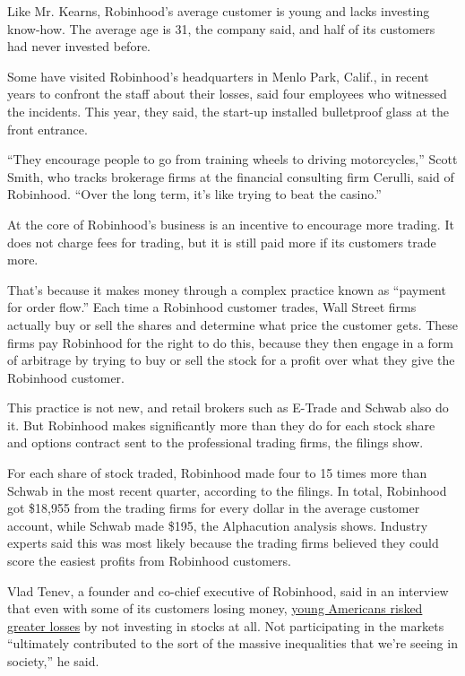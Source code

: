 Like Mr. Kearns, Robinhood's average customer is young and lacks
investing know-how. The average age is 31, the company said, and half of
its customers had never invested before.

Some have visited Robinhood's headquarters in Menlo Park, Calif., in
recent years to confront the staff about their losses, said four
employees who witnessed the incidents. This year, they said, the
start-up installed bulletproof glass at the front entrance.

``They encourage people to go from training wheels to driving
motorcycles,'' Scott Smith, who tracks brokerage firms at the financial
consulting firm Cerulli, said of Robinhood. ``Over the long term, it's
like trying to beat the casino.''

At the core of Robinhood's business is an incentive to encourage more
trading. It does not charge fees for trading, but it is still paid more
if its customers trade more.

That's because it makes money through a complex practice known as
``payment for order flow.'' Each time a Robinhood customer trades, Wall
Street firms actually buy or sell the shares and determine what price
the customer gets. These firms pay Robinhood for the right to do this,
because they then engage in a form of arbitrage by trying to buy or sell
the stock for a profit over what they give the Robinhood customer.

This practice is not new, and retail brokers such as E-Trade and Schwab
also do it. But Robinhood makes significantly more than they do for each
stock share and options contract sent to the professional trading firms,
the filings show.

For each share of stock traded, Robinhood made four to 15 times more
than Schwab in the most recent quarter, according to the filings. In
total, Robinhood got \$18,955 from the trading firms for every dollar in
the average customer account, while Schwab made \$195, the Alphacution
analysis shows. Industry experts said this was most likely because the
trading firms believed they could score the easiest profits from
Robinhood customers.

Vlad Tenev, a founder and co-chief executive of Robinhood, said in an
interview that even with some of its customers losing money,
\href{https://www.nytimes.com/2020/04/06/business/millennials-economic-crisis-virus.html}{young
Americans risked greater losses} by not investing in stocks at all. Not
participating in the markets ``ultimately contributed to the sort of the
massive inequalities that we're seeing in society,'' he said.

